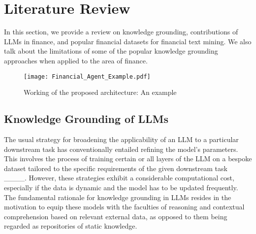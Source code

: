 \section{Literature Review}
\label{sec:kg-survey}
In this section, we provide a review on knowledge grounding, contributions of LLMs in finance, and popular financial datasets for financial text mining. We also talk about the limitations of some of the popular knowledge grounding approaches when applied to the area of finance.

\begin{figure}[t]
  \centering %
  \texttt{[image: Financial\_Agent\_Example.pdf]}
  \caption{Working of the proposed architecture: An example}
  \label{fig:Financial Agent-exmp}
\end{figure}

\subsection{Knowledge Grounding of LLMs}
The usual strategy for broadening the applicability of an LLM to a particular downstream task has conventionally entailed refining the model's parameters. This involves the process of training certain or all layers of the LLM on a bespoke dataset tailored to the specific requirements of the given downstream task ____. However, these strategies exhibit a considerable computational cost, especially if the data is dynamic and the model has to be updated frequently. %
The fundamental rationale for knowledge grounding in LLMs resides in the motivation to equip these models with the faculties of reasoning and contextual comprehension based on relevant external data, as opposed to them being regarded as repositories of static knowledge.

